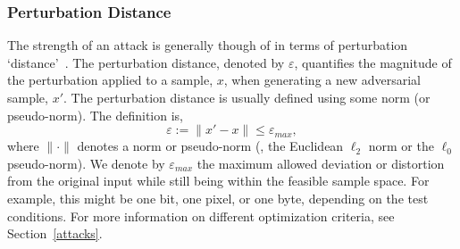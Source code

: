 \subsubsection{Perturbation Distance}

\label{perturbation_distance}
The strength of an attack is generally though of in terms of perturbation `distance'~\citep{croce_reliable_2020,chakraborty_adversarial_2018,pixelattack}. The perturbation distance, denoted by $\varepsilon$, quantifies the magnitude of the perturbation applied to a sample, $x$, when generating a new adversarial sample, $x'$. The perturbation distance is usually defined using some norm (or pseudo-norm). The definition is,
\[
    \varepsilon := \| x' - x \| \leq \varepsilon_{max},
\]
where $\| \cdot \|$ denotes a norm or pseudo-norm (\eg, the Euclidean $\ell_2$ norm or the $\ell_0$ pseudo-norm). We denote by $\varepsilon_{max}$ the maximum allowed deviation or distortion from the original input while still being within the feasible sample space. For example, this might be one bit, one pixel, or one byte, depending on the test conditions. For more information on different optimization criteria, see Section~\ref{attacks}.


